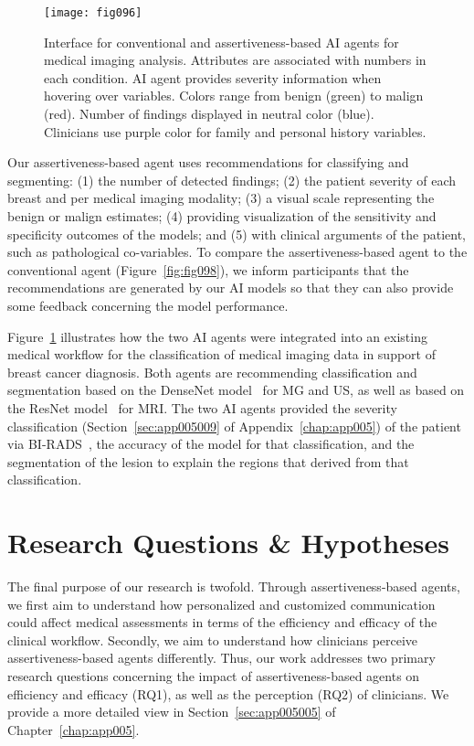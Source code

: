 \begin{figure}[htpb]
\centering
\texttt{[image: fig096]}
\caption[]{Interface for conventional and assertiveness-based AI agents for medical imaging analysis. Attributes are associated with numbers in each condition. AI agent provides severity information when hovering over variables. Colors range from benign (green) to malign (red). Number of findings displayed in neutral color (blue). Clinicians use purple color for family and personal history variables.}
\label{fig:fig096}
\end{figure}

Our assertiveness-based agent uses recommendations for classifying and segmenting:
(1) the number of detected findings;
(2) the patient severity of each breast and per medical imaging modality;
(3) a visual scale representing the benign or malign estimates;
(4) providing visualization of the sensitivity and specificity outcomes of the models; and
(5) with clinical arguments of the patient, such as pathological co-variables.
To compare the assertiveness-based agent to the conventional agent (Figure~\ref{fig:fig098}), we inform participants that the recommendations are generated by our \ac{AI} models so that they can also provide some feedback concerning the model performance.

Figure~\ref{fig:fig096} illustrates how the two \ac{AI} agents were integrated into an existing medical workflow for the classification of medical imaging data in support of breast cancer diagnosis.
Both agents are recommending classification and segmentation based on the DenseNet model~\cite{8721151} for \ac{MG} and \ac{US}, as well as based on the ResNet model~\cite{10.1145/3544548.3580682} for \ac{MRI}.
The two \ac{AI} agents provided the severity classification (Section~\ref{sec:app005009} of Appendix~\ref{chap:app005}) of the patient via \ac{BI-RADS}~\cite{SPAK2017179}, the accuracy of the model for that classification, and the segmentation of the lesion to explain the regions that derived from that classification.

\section{Research Questions \& Hypotheses}
\label{sec:chap006004}

The final purpose of our research is twofold.
Through assertiveness-based agents, we first aim to understand how personalized and customized communication could affect medical assessments in terms of the efficiency and efficacy of the clinical workflow.
Secondly, we aim to understand how clinicians perceive assertiveness-based agents differently.
Thus, our work addresses two primary research questions concerning the impact of assertiveness-based agents on efficiency and efficacy (RQ1), as well as the perception (RQ2) of clinicians.
We provide a more detailed view in Section~\ref{sec:app005005} of Chapter~\ref{chap:app005}.

